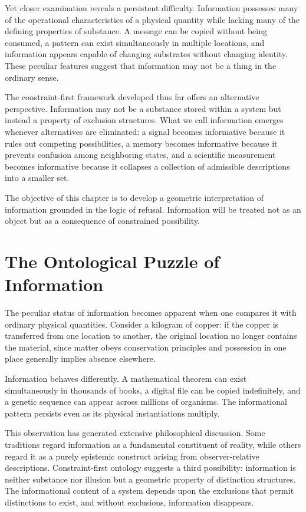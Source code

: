 \documentclass[11pt,oneside]{book}
\theoremstyle{plain}
\theoremstyle{definition}
\theoremstyle{remark}
\begin{document}
Yet closer examination reveals a persistent difficulty. Information possesses many of the operational characteristics of a physical quantity while lacking many of the defining properties of substance. A message can be copied without being consumed, a pattern can exist simultaneously in multiple locations, and information appears capable of changing substrates without changing identity. These peculiar features suggest that information may not be a thing in the ordinary sense.

The constraint-first framework developed thus far offers an alternative perspective. Information may not be a substance stored within a system but instead a property of exclusion structures. What we call information emerges whenever alternatives are eliminated: a signal becomes informative because it rules out competing possibilities, a memory becomes informative because it prevents confusion among neighboring states, and a scientific measurement becomes informative because it collapses a collection of admissible descriptions into a smaller set.

The objective of this chapter is to develop a geometric interpretation of information grounded in the logic of refusal. Information will be treated not as an object but as a consequence of constrained possibility.

\section{The Ontological Puzzle of Information}

The peculiar status of information becomes apparent when one compares it with ordinary physical quantities. Consider a kilogram of copper: if the copper is transferred from one location to another, the original location no longer contains the material, since matter obeys conservation principles and possession in one place generally implies absence elsewhere.

Information behaves differently. A mathematical theorem can exist simultaneously in thousands of books, a digital file can be copied indefinitely, and a genetic sequence can appear across millions of organisms. The informational pattern persists even as its physical instantiations multiply.

This observation has generated extensive philosophical discussion. Some traditions regard information as a fundamental constituent of reality, while others regard it as a purely epistemic construct arising from observer-relative descriptions. Constraint-first ontology suggests a third possibility: information is neither substance nor illusion but a geometric property of distinction structures. The informational content of a system depends upon the exclusions that permit distinctions to exist, and without exclusions, information disappears.
\end{document}
